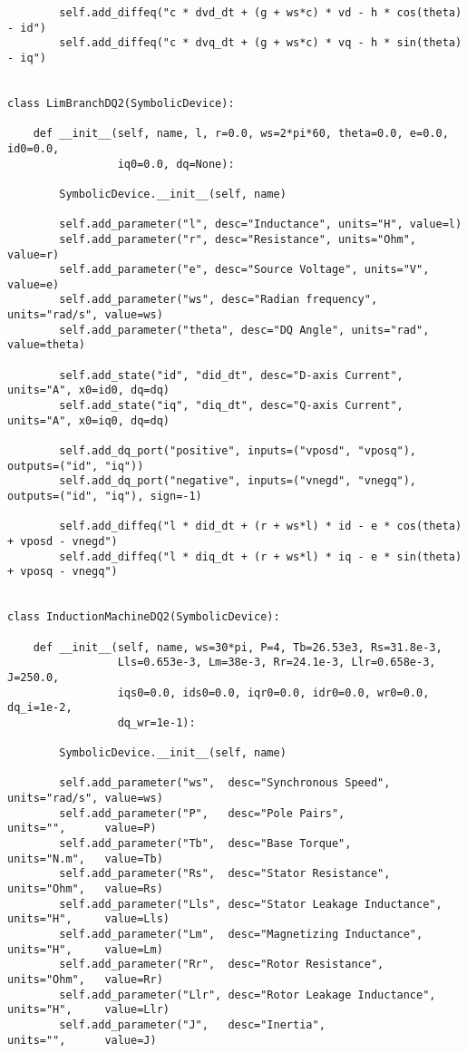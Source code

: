 \begin{lstlisting}
        self.add_diffeq("c * dvd_dt + (g + ws*c) * vd - h * cos(theta) - id")
        self.add_diffeq("c * dvq_dt + (g + ws*c) * vq - h * sin(theta) - iq")


class LimBranchDQ2(SymbolicDevice):

    def __init__(self, name, l, r=0.0, ws=2*pi*60, theta=0.0, e=0.0, id0=0.0,
                 iq0=0.0, dq=None):

        SymbolicDevice.__init__(self, name)

        self.add_parameter("l", desc="Inductance", units="H", value=l)
        self.add_parameter("r", desc="Resistance", units="Ohm", value=r)
        self.add_parameter("e", desc="Source Voltage", units="V", value=e)
        self.add_parameter("ws", desc="Radian frequency", units="rad/s", value=ws)
        self.add_parameter("theta", desc="DQ Angle", units="rad", value=theta)

        self.add_state("id", "did_dt", desc="D-axis Current", units="A", x0=id0, dq=dq)
        self.add_state("iq", "diq_dt", desc="Q-axis Current", units="A", x0=iq0, dq=dq)

        self.add_dq_port("positive", inputs=("vposd", "vposq"), outputs=("id", "iq"))
        self.add_dq_port("negative", inputs=("vnegd", "vnegq"), outputs=("id", "iq"), sign=-1)

        self.add_diffeq("l * did_dt + (r + ws*l) * id - e * cos(theta) + vposd - vnegd")
        self.add_diffeq("l * diq_dt + (r + ws*l) * iq - e * sin(theta) + vposq - vnegq")


class InductionMachineDQ2(SymbolicDevice):

    def __init__(self, name, ws=30*pi, P=4, Tb=26.53e3, Rs=31.8e-3,
                 Lls=0.653e-3, Lm=38e-3, Rr=24.1e-3, Llr=0.658e-3, J=250.0,
                 iqs0=0.0, ids0=0.0, iqr0=0.0, idr0=0.0, wr0=0.0, dq_i=1e-2,
                 dq_wr=1e-1):

        SymbolicDevice.__init__(self, name)

        self.add_parameter("ws",  desc="Synchronous Speed",         units="rad/s", value=ws)
        self.add_parameter("P",   desc="Pole Pairs",                units="",      value=P)
        self.add_parameter("Tb",  desc="Base Torque",               units="N.m",   value=Tb)
        self.add_parameter("Rs",  desc="Stator Resistance",         units="Ohm",   value=Rs)
        self.add_parameter("Lls", desc="Stator Leakage Inductance", units="H",     value=Lls)
        self.add_parameter("Lm",  desc="Magnetizing Inductance",    units="H",     value=Lm)
        self.add_parameter("Rr",  desc="Rotor Resistance",          units="Ohm",   value=Rr)
        self.add_parameter("Llr", desc="Rotor Leakage Inductance",  units="H",     value=Llr)
        self.add_parameter("J",   desc="Inertia",                   units="",      value=J)


\end{lstlisting}
